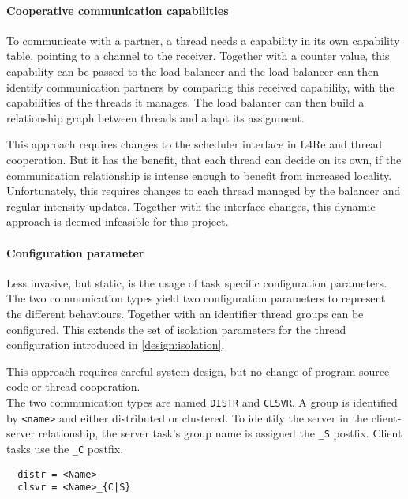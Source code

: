 \paragraph{Cooperative communication capabilities}
To communicate with a partner, a thread needs a capability in its own
capability table, pointing to a channel to the receiver.
Together with a counter value, this capability can be passed to the load
balancer and the load balancer can then identify communication partners
by comparing this received capability, with the capabilities of the threads
it manages.
The load balancer can then build a relationship graph between threads and adapt
its assignment.

This approach requires changes to the scheduler interface in L4Re and
thread cooperation.
But it has the benefit, that each thread can decide on its own, if the
communication relationship is intense enough to benefit from increased
locality.
Unfortunately, this requires changes to each thread managed by the balancer and
regular intensity updates.
Together with the interface changes, this dynamic approach is deemed infeasible
for this project.

\paragraph{Configuration parameter}
Less invasive, but static, is the usage of task specific configuration parameters.
The two communication types yield two configuration parameters to represent the
different behaviours.
Together with an identifier thread groups can be configured.
This extends the set of isolation parameters for the thread configuration
introduced in \ref{design:isolation}.

This approach requires careful system design, but no change of program source
code or thread cooperation.
\\

The two communication types are named \texttt{DISTR} and \texttt{CLSVR}.
A group is identified by \texttt{<name>} and either distributed or clustered.
To identify the server in the client-server relationship, the server task's
group name is assigned the \texttt{\_S} postfix.
Client tasks use the \texttt{\_C} postfix.

\begin{lstlisting}
  distr = <Name>
  clsvr = <Name>_{C|S}
\end{lstlisting}
